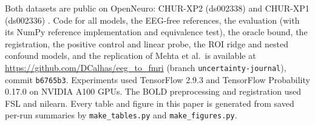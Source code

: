 Both datasets are public on OpenNeuro: CHUR-XP2 (ds002338) and CHUR-XP1 (ds002336) \citep{lioi2019simultaneous}. Code for all models, the EEG-free references, the evaluation (with its NumPy reference implementation and equivalence test), the oracle bound, the registration, the positive control and linear probe, the ROI ridge and nested confound models, and the replication of Mehta et al.\ is available at \url{https://github.com/DCalhas/eeg_to_fmri} (branch \texttt{uncertainty-journal}), commit \texttt{b6765b3}. Experiments used TensorFlow 2.9.3 and TensorFlow Probability 0.17.0 on NVIDIA A100 GPUs. The BOLD preprocessing and registration used FSL and nilearn. Every table and figure in this paper is generated from saved per-run summaries by \texttt{make\_tables.py} and \texttt{make\_figures.py}.
